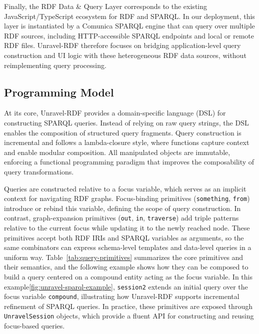\documentclass[
]{ceurart}
\begin{document}
Finally, the RDF Data \& Query Layer corresponds to the existing
JavaScript/TypeScript ecosystem for RDF and SPARQL. In our deployment,
this layer is instantiated by a Comunica SPARQL engine that can query
over multiple RDF sources, including HTTP-accessible SPARQL endpoints
and local or remote RDF files. Unravel-RDF therefore focuses on bridging
application-level query construction and UI logic with these
heterogeneous RDF data sources, without reimplementing query processing.

\subsection{Programming Model}

At its core, Unravel-RDF provides a domain-specific language (DSL) for
constructing SPARQL queries. Instead of relying on raw query strings,
the DSL enables the composition of structured query fragments.
Query construction is incremental and follows a lambda-closure style,
where functions capture context and enable modular composition.
All manipulated objects are immutable, enforcing a functional
programming paradigm that improves the composability of query
transformations.

Queries are constructed relative to a focus variable, which serves as
an implicit context for navigating RDF graphs. Focus-binding primitives
(\texttt{something}, \texttt{from}) introduce or rebind this variable,
defining the scope of query construction. In contrast, graph-expansion
primitives (\texttt{out}, \texttt{in}, \texttt{traverse}) add triple
patterns relative to the current focus while updating it to the newly
reached node. These primitives accept both RDF IRIs and SPARQL variables
as arguments, so the same combinators can express schema-level templates
and data-level queries in a uniform way. Table~\ref{tab:query-primitives}
summarizes the core primitives and their semantics, and the following
example shows how they can be composed to build a query centered on a
compound entity acting as the focus variable. In this example\ref{fig:unravel-sparql-example}, 
\texttt{session2} extends an initial query over the focus variable \texttt{compound}, 
illustrating how Unravel-RDF supports incremental refinement of SPARQL queries.
In practice, these primitives are exposed through \texttt{UnravelSession} objects, which provide a fluent 
API for constructing and reusing focus-based queries.
\end{document}
